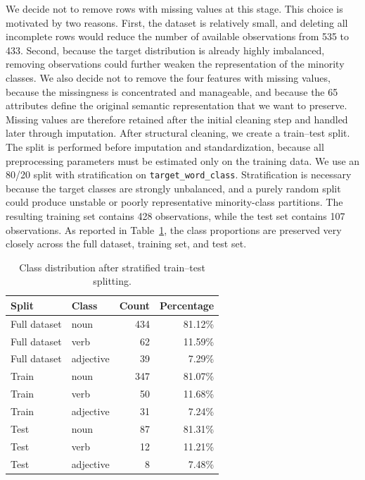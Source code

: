 \documentclass{ipgpmaster}
\begin{document}
We decide not to remove rows with missing values at this stage. This choice is motivated by two reasons. 
First, the dataset is relatively small, and deleting all incomplete rows would reduce the number of available observations from 535 to 433. 
Second, because the target distribution is already highly imbalanced, removing observations could further weaken the representation of the minority classes.
We also decide not to remove the four features with missing values, because the missingness is concentrated and manageable, and because the 65 attributes define the original semantic representation that we want to preserve. Missing values are therefore retained after the initial cleaning step and handled later through imputation.
After structural cleaning, we create a train--test split. The split is performed before imputation and standardization, because all preprocessing parameters must be estimated only on the training data. We use an 80/20 split with stratification on \texttt{target\_word\_class}. Stratification is necessary because the target classes are strongly unbalanced, and a purely random split could produce unstable or poorly representative minority-class partitions. The resulting training set contains 428 observations, while the test set contains 107 observations. As reported in Table~\ref{tab:stratified_split_distribution}, the class proportions are preserved very closely across the full dataset, training set, and test set.
\begin{table}[H]
\centering
\begin{tabular}{llrr}
\toprule
\textbf{Split} & \textbf{Class} & \textbf{Count} & \textbf{Percentage} \\
\midrule
Full dataset & noun & 434 & 81.12\% \\
Full dataset & verb & 62 & 11.59\% \\
Full dataset & adjective & 39 & 7.29\% \\
\midrule
Train & noun & 347 & 81.07\% \\
Train & verb & 50 & 11.68\% \\
Train & adjective & 31 & 7.24\% \\
\midrule
Test & noun & 87 & 81.31\% \\
Test & verb & 12 & 11.21\% \\
Test & adjective & 8 & 7.48\% \\
\bottomrule
\end{tabular}
\caption{Class distribution after stratified train--test splitting.}
\label{tab:stratified_split_distribution}
\end{table}
\end{document}
